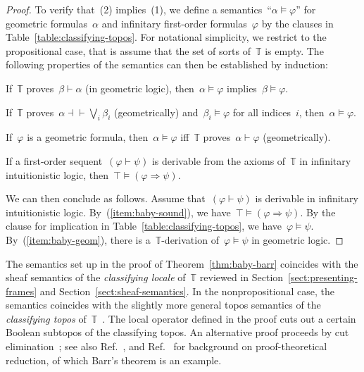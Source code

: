 \documentclass{ws-rv9x6}
\newcommand{\TT}{\mathbb{T}}
\renewcommand{\_}{\mathpunct{.}}
\newcommand{\?}{\,{:}\,}
\begin{document}
\begin{proof}
To verify that~(2) implies~(1), we define a semantics~``$\alpha \models
\varphi$'' for geometric formulas~$\alpha$ and infinitary first-order
formulas~$\varphi$ by the clauses in Table~\ref{table:classifying-topos}. For
notational simplicity, we restrict to the propositional case, that is assume that the set of
sorts of~$\TT$ is empty.
The following properties of the semantics can then be established by induction:
\begin{alphlist}[(d)]
\item If~$\TT$ proves~$\beta \vdash \alpha$ (in geometric logic), then~$\alpha \models \varphi$ implies~$\beta
\models \varphi$.
\item If~$\TT$ proves~$\alpha \dashv\vdash \bigvee_i \beta_i$ (geometrically) and~$\beta_i \models \varphi$ for
all indices~$i$, then~$\alpha \models \varphi$.
\item\label{item:baby-geom} If~$\varphi$ is a geometric formula, then~$\alpha
\models \varphi$ iff~$\TT$ proves~$\alpha \vdash \varphi$ (geometrically).
\item\label{item:baby-sound} If a first-order sequent~$(\varphi \vdash \psi)$
is derivable from the axioms of~$\TT$ in infinitary intuitionistic logic,
then~$\top \models (\varphi \Rightarrow \psi)$.
\end{alphlist}
We can then conclude as follows. Assume that~$(\varphi \vdash \psi)$
is derivable in infinitary intuitionistic logic. By~(\ref{item:baby-sound}), we
have~$\top \models (\varphi \Rightarrow \psi)$. By the clause for implication
in Table~\ref{table:classifying-topos}, we have~$\varphi \models \psi$.
By~(\ref{item:baby-geom}), there is a~$\TT$-derivation of~$\varphi \models
\psi$ in geometric logic.
\end{proof}

\begin{remark}The semantics set up in the proof of Theorem~\ref{thm:baby-barr}
coincides with the sheaf semantics of the \emph{classifying locale} of~$\TT$
reviewed in Section~\ref{sect:presenting-frames} and
Section~\ref{sect:sheaf-semantics}. In the nonpropositional case, the semantics
coincides with the slightly more general topos semantics of the
\emph{classifying topos} of~$\TT$~\cite[Section~2]{caramello:tst}. The local
operator defined in the proof cuts out a certain Boolean subtopos of the
classifying topos. An alternative proof proceeds by cut
elimination~\cite[Section~6]{rathjen:barr}; see also
Ref.~, and
Ref.~ for background on proof-theoretical
reduction, of which Barr's theorem is an example.
\end{remark}
\end{document}
